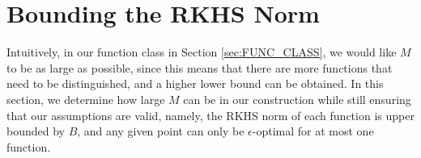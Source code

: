 \documentclass[english,onecolumn,final,11pt]{IEEEtran} %
\begin{document}
%
%

\section{Bounding the RKHS Norm} \label{sec:BOUND_RKHS}

Intuitively, in our function class in Section \ref{sec:FUNC_CLASS}, we would like $M$ to be as large as possible, since this means that there are more functions that need to be distinguished, and a higher lower bound can be obtained.  In this section, we determine how large $M$ can be in our construction while still ensuring that our assumptions are valid, namely, the RKHS norm of each function is upper bounded by $B$, and any given point can only be $\epsilon$-optimal for at most one function. 
\end{document}
